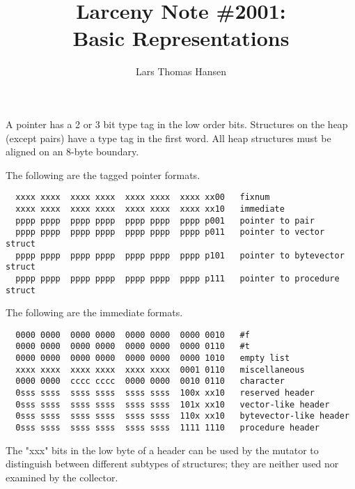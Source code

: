 %


\title{Larceny Note \#2001: \\
       Basic Representations}
\author{Lars Thomas Hansen}


\maketitle

A pointer has a 2 or 3 bit type tag in the low order bits. Structures on
the heap (except pairs) have a type tag in the first word. All heap
structures must be aligned on an 8-byte boundary.

The following are the tagged pointer formats.

\begin{minipage}{\linewidth}
\begin{verbatim}
  xxxx xxxx  xxxx xxxx  xxxx xxxx  xxxx xx00   fixnum
  xxxx xxxx  xxxx xxxx  xxxx xxxx  xxxx xx10   immediate
  pppp pppp  pppp pppp  pppp pppp  pppp p001   pointer to pair 
  pppp pppp  pppp pppp  pppp pppp  pppp p011   pointer to vector struct
  pppp pppp  pppp pppp  pppp pppp  pppp p101   pointer to bytevector struct
  pppp pppp  pppp pppp  pppp pppp  pppp p111   pointer to procedure struct
\end{verbatim}
\end{minipage}

The following are the immediate formats.

\begin{minipage}{\linewidth}
\begin{verbatim}
  0000 0000  0000 0000  0000 0000  0000 0010   #f
  0000 0000  0000 0000  0000 0000  0000 0110   #t
  0000 0000  0000 0000  0000 0000  0000 1010   empty list
  xxxx xxxx  xxxx xxxx  xxxx xxxx  0001 0110   miscellaneous
  0000 0000  cccc cccc  0000 0000  0010 0110   character
  0sss ssss  ssss ssss  ssss ssss  100x xx10   reserved header
  0sss ssss  ssss ssss  ssss ssss  101x xx10   vector-like header
  0sss ssss  ssss ssss  ssss ssss  110x xx10   bytevector-like header
  0sss ssss  ssss ssss  ssss ssss  1111 1110   procedure header
\end{verbatim}
\end{minipage}

The "xxx" bits in the low byte of a header can be used by the mutator to
distinguish between different subtypes of structures; they are neither
used nor examined by the collector.

